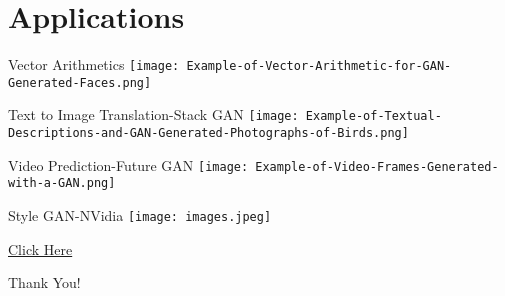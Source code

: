 \documentclass{beamer}
\begin{document}
\section{Applications}
\begin{frame}{Vector Arithmetics}
\texttt{[image: Example-of-Vector-Arithmetic-for-GAN-Generated-Faces.png]}
\end{frame}
\begin{frame}{Text to Image Translation-Stack GAN}
\texttt{[image: Example-of-Textual-Descriptions-and-GAN-Generated-Photographs-of-Birds.png]}
\end{frame}
\begin{frame}{Video Prediction-Future GAN}
\texttt{[image: Example-of-Video-Frames-Generated-with-a-GAN.png]}
\end{frame}
\begin{frame}{Style GAN-NVidia}
\texttt{[image: images.jpeg]}
\centerline{\href{https://thispersondoesnotexist.com/}{Click Here }}
\end{frame}
\begin{frame}{}
\centerline{Thank You!}
\end{frame}
\end{document}
